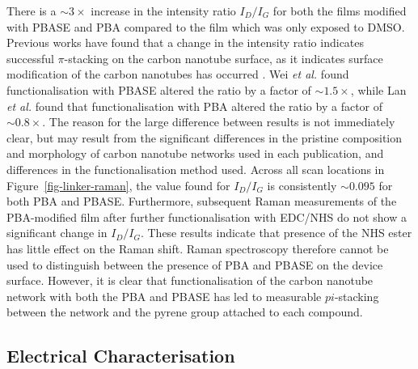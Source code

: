 \documentclass[
  a4paper,
]{scrbook}
\begin{document}
There is a \(\sim 3 \times\) increase in the intensity ratio \(I_D/I_G\)
for both the films modified with PBASE and PBA compared to the film
which was only exposed to DMSO. Previous works have found that a change
in the intensity ratio indicates successful \(\pi\)-stacking on the
carbon nanotube surface, as it indicates surface modification of the
carbon nanotubes has occurred \autocite{Wei2010,Lan2013}. Wei \emph{et
al.} \autocite{Wei2010} found functionalisation with PBASE altered the
ratio by a factor of \(\sim 1.5 \times\), while Lan \emph{et al.}
\autocite{Lan2013} found that functionalisation with PBA altered the
ratio by a factor of \(\sim 0.8 \times\). The reason for the large
difference between results is not immediately clear, but may result from
the significant differences in the pristine composition and morphology
of carbon nanotube networks used in each publication, and differences in
the functionalisation method used. Across all scan locations in
Figure~\ref{fig-linker-raman}, the value found for \(I_D/I_G\) is
consistently \(\sim 0.095\) for both PBA and PBASE. Furthermore,
subsequent Raman measurements of the PBA-modified film after further
functionalisation with EDC/NHS do not show a significant change in
\(I_D/I_G\). These results indicate that presence of the NHS ester has
little effect on the Raman shift. Raman spectroscopy therefore cannot be
used to distinguish between the presence of PBA and PBASE on the device
surface. However, it is clear that functionalisation of the carbon
nanotube network with both the PBA and PBASE has led to measurable
\(pi\)-stacking between the network and the pyrene group attached to
each compound.

\hypertarget{sec-PBA-characterisation}{%
\subsection{Electrical
Characterisation}\label{sec-PBA-characterisation}}
\end{document}

